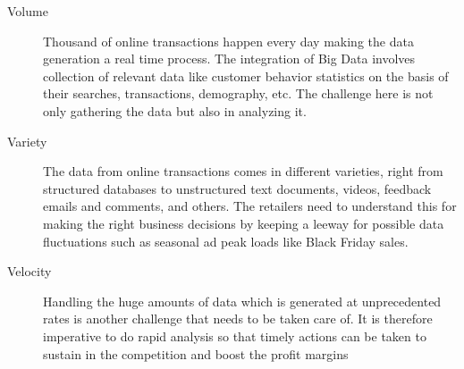 \begin{description}
\item[Volume] Thousand of online transactions happen every day making the data generation a real time process. The integration of Big Data involves collection of relevant data like customer behavior statistics on the basis of their searches, transactions, demography, etc. The challenge here is not only gathering the data but also in analyzing it.
\item[Variety] The data from online transactions comes in different varieties, right from structured databases to unstructured text documents, videos, feedback emails and comments, and others. The retailers need to understand this for making the right business decisions by keeping a leeway for possible data fluctuations such as seasonal ad peak loads like Black Friday sales.
\item[Velocity] Handling the huge amounts of data which is generated at unprecedented rates is another challenge that needs to be taken care of. It is therefore imperative to do rapid analysis so that timely actions can be taken to sustain in the competition and boost the profit margins
\end{description}

